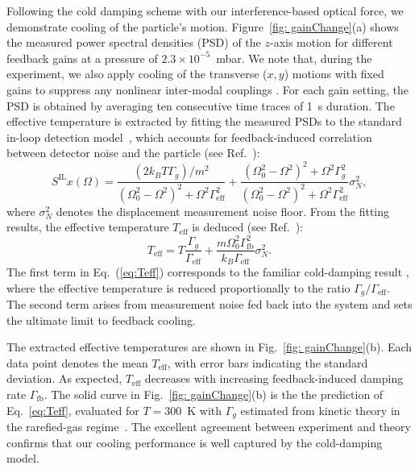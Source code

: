\documentclass[%
 reprint,
 amsmath,amssymb,
 aps,
prl,
]{revtex4-2}
\begin{document}
Following the cold damping scheme with our interference-based optical force, we demonstrate cooling of the particle's motion. Figure~\ref{fig: gainChange}(a) shows the measured power spectral densities (PSD) of the $z$-axis motion for different feedback gains at a pressure of $2.3\times10^{-5}$~mbar. We note that, during the experiment, we also apply cooling of the transverse ($x,y$) motions with fixed gains to suppress any nonlinear inter-modal couplings \cite{magrini_real-time_2021, tebbenjohanns_quantum_2021}. For each gain setting, the PSD is obtained by averaging ten consecutive time traces of 1~s duration. The effective temperature is extracted by fitting the measured PSDs to the standard in-loop detection model~\cite{conangla_optimal_2019, melo_vacuum_2024, vijayan_scalable_2023}, which accounts for feedback-induced correlation between detector noise and the particle (see Ref.~\cite{SM}):
\begin{equation}
S^{\mathrm{IL}}x(\Omega) =\frac{(2k_B T \Gamma_g)/m^2}{(\Omega_0^2 -\Omega^2 )^2 + \Omega^2 \Gamma_{\text{eff}} ^2}+\frac{(\Omega_0^2 -\Omega^2 )^2 + \Omega^2 \Gamma_g^2}{(\Omega_0^2 -\Omega^2 )^2 + \Omega^2 \Gamma_{\text{eff}}^2}\sigma_N^2 ,
\label{eq:motion_fft_IL_PSD}
\end{equation}
where $\sigma_N^2$ denotes the displacement measurement noise floor. From the fitting results, the effective temperature $T_{\mathrm{eff}}$ is deduced (see Ref.~\cite{SM}):
\begin{equation}
T_{\mathrm{eff}} =
T\frac{\Gamma_g}{\Gamma_{\mathrm{eff}}}
+ \frac{m\Omega_0^2 \Gamma_{\mathrm{fb}}^2}{k_B \Gamma_{\mathrm{eff}}}\sigma_N^2 .
\label{eq:Teff}
\end{equation}
The first term in Eq.~(\ref{eq:Teff}) corresponds to the familiar cold-damping result \cite{cohadon_cooling_1999, poggio_feedback_2007}, where the effective temperature is reduced proportionally to the ratio $\Gamma_g/\Gamma_{\mathrm{eff}}$. The second term arises from measurement noise fed back into the system and sets the ultimate limit to feedback cooling.

The extracted effective temperatures are shown in Fig.~\ref{fig: gainChange}(b). Each data point denotes the mean $T_{\mathrm{eff}}$, with error bars indicating the standard deviation. As expected, $T_{\mathrm{eff}}$ decreases with increasing feedback-induced damping rate $\Gamma_{\mathrm{fb}}$. The solid curve in Fig.~\ref{fig: gainChange}(b) is the the prediction of Eq.~\ref{eq:Teff}, evaluated for $T=300$~K with $\Gamma_g$ estimated from kinetic theory in the rarefied-gas regime~\cite{gas_damping_theory_1990}. The excellent agreement between experiment and theory confirms that our cooling performance is well captured by the cold-damping model.
\end{document}

